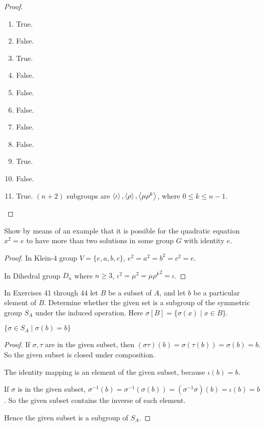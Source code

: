 \begin{proof}
    \begin{enumerate}[label={\textbf{\alph*}}]
        \item True.
        \item False.
        \item True.
        \item False.
        \item False.
        \item False.
        \item False.
        \item False.
        \item True.
        \item False.
        \item True. $(n+2)$ subgroups are $\left\langle{\iota}\right\rangle, \left\langle{\rho}\right\rangle, \left\langle{\mu\rho^{k}}\right\rangle$, where $0\leq k \leq n-1$.
    \end{enumerate}
\end{proof}

\begin{exercise}
    Show by means of an example that it is possible for the quadratic equation $x^{2} = e$ to have more than two solutions in some group $G$ with identity $e$.
\end{exercise}

\begin{proof}
    In Klein-4 group $V = \{ e, a, b, c \}$, $e^{2} = a^{2} = b^{2} = c^{2} = e$.

    In Dihedral group $D_{n}$ where $n\geq 3$, $\iota^{2} = {\mu}^{2} = {\mu\rho^{k}}^{2} = \iota$.
\end{proof}

In Exercises 41 through 44 let $B$ be a subset of $A$, and let $b$ be a particular element of $B$. Determine whether the given set is a subgroup of the symmetric group $S_{A}$ under the induced operation. Here $\sigma[B] = \{ \sigma(x) \mid x\in B \}$.

\begin{exercise}
    $\{ \sigma\in S_{A} \mid \sigma(b) = b \}$
\end{exercise}

\begin{proof}
    If $\sigma, \tau$ are in the given subset, then $(\sigma\tau)(b) = \sigma(\tau(b)) = \sigma(b) = b$. So the given subset is closed under composition.

    The identity mapping is an element of the given subset, because $\iota(b) = b$.

    If $\sigma$ is in the given subset, $\sigma^{-1}(b) = \sigma^{-1}(\sigma(b)) = (\sigma^{-1}\sigma)(b) = \iota(b) = b$. So the given subset contains the inverse of each element.

    Hence the given subset is a subgroup of $S_{A}$.
\end{proof}

